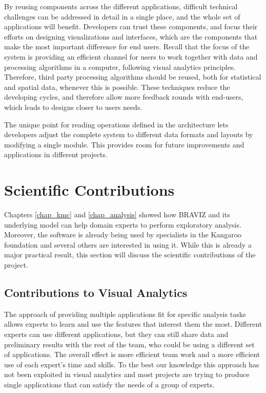 {By reusing components across the different applications, difficult technical challenges can be addressed in detail in a single place, and the whole set of applications will benefit. Developers can trust these components, and focus their efforts on designing visualizations and interfaces, which are the components that make the most important difference for end users. Recall that the focus of the system is providing an efficient channel for users to work together with data and processing algorithms in a computer, following visual analytics principles. Therefore, third party processing algorithms should be reused, both for statistical and spatial data, whenever this is possible. These techniques reduce the developing cycles, and therefore allow more feedback rounds with end-users, which leads to designs closer to users needs.

The unique point for reading operations defined in the architecture lets developers adjust the complete system to different data formats and layouts by modifying a single module. This provides room for future improvements and applications in different projects. 



\section{Scientific Contributions}

Chapters \ref{chap_kmc} and \ref{chap_analysis} showed how BRAVIZ and its underlying model can help domain experts to perform exploratory analysis. Moreover, the software is already being used by specialists in the Kangaroo foundation and several others are interested in using it. While this is already a major practical result, this section will discuss the scientific contributions of the project. 

\subsection{Contributions to Visual Analytics}

The approach of providing multiple applications fit for specific analysis tasks allows experts to learn and use the features that interest them the most. Different experts can use different applications, but they can still share data and preliminary results with the rest of the team, who could be using a different set of applications. The overall effect is more efficient team work and a more efficient use of each expert's time and skills. To the best our knowledge this approach has not been exploited in visual analytics and most projects are trying to produce single applications that can satisfy the needs of a group of experts. 

}
